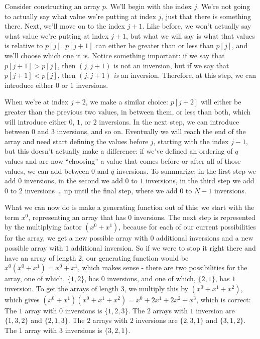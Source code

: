\documentclass{article}
\begin{document}
Consider constructing an array $p$. We’ll begin with the index $j$. We’re not going to actually say what value we’re putting at index $j$, just that there is something there. Next, we’ll move on to the index $j + 1$. Like before, we won’t actually say what value we’re putting at index $j + 1$, but what we will say is what that values is relative to $p[j]$. $p[j + 1]$ can either be greater than or less than $p[j]$, and we’ll choose which one it is. Notice something important: if we say that $p[j + 1] > p[j]$, then $(j, j + 1)$ is not an inversion, but if we say that $p[j + 1] < p[j]$, then $(j, j + 1)$ \textit{is} an inversion. Therefore, at this step, we can introduce either $0$ or $1$ inversions.

When we’re at index $j + 2$, we make a similar choice: $p[j + 2]$ will either be greater than the previous two values, in between them, or less than both, which will introduce either $0$, $1$, or $2$ inversions. In the next step, we can introduce between $0$ and $3$ inversions, and so on. Eventually we will reach the end of the array and need start defining the values before $j$, starting with the index $j - 1$, but this doesn’t actually make a difference: if we’ve defined an ordering of $q$ values and are now “choosing” a value that comes before or after all of those values, we can add between $0$ and $q$ inversions. To summarize: in the first step we add $0$ inversions, in the second we add $0$ to $1$ inversions, in the third step we add $0$ to $2$ inversions … up until the final step, where we add $0$ to $N - 1$ inversions.

What we can now do is make a generating function out of this: we start with the term $x^0$, representing an array that has $0$ inversions. The next step is represented by the multiplying factor $(x^0 + x^1)$, because for each of our current possibilities for the array, we get a new possible array with $0$ additional inversions and a new possible array with $1$ additional inversion. So if we were to stop it right there and have an array of length $2$, our generating function would be $x^0(x^0 + x^1) = x^0 + x^1$, which makes sense - there are two possibilities for the array, one of which, $\{1, 2\}$, has $0$ inversions, and one of which, $\{2, 1\}$, has $1$ inversion. To get the arrays of length $3$, we multiply this by $(x^0 + x^1 + x^2)$, which gives $(x^0 + x^1)(x^0 + x^1 + x^2) = x^0 + 2x^1 + 2x^2 + x^3$, which is correct:
The $1$ array with $0$ inversions is $\{1, 2, 3\}$.
The $2$ arrays with $1$ inversion are $\{1, 3, 2\}$ and $\{2, 1, 3\}$.
The $2$ arrays with $2$ inversions are $\{2, 3, 1\}$ and $\{3, 1, 2\}$.
The $1$ array with $3$ inversions is $\{3, 2, 1\}$.
\end{document}
